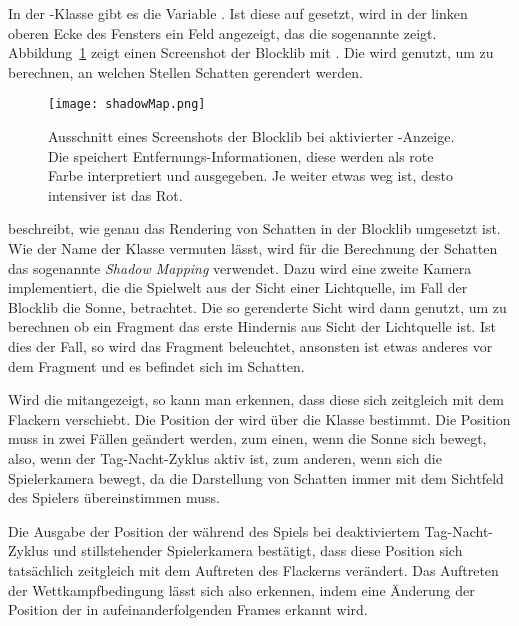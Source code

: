 In der -Klasse gibt es die Variable . Ist diese auf  gesetzt, wird in der linken oberen Ecke des Fensters ein Feld angezeigt, das die sogenannte  zeigt. Abbildung~\ref{fig:ShadowMap} zeigt einen Screenshot der Blocklib mit . Die  wird genutzt, um zu berechnen, an welchen Stellen Schatten gerendert werden.
\begin{figure}
	\centering
	\texttt{[image: shadowMap.png]}
	\caption[Ausschnitt eines Screenshots der Blocklib bei aktivierter -Anzeige.]{Ausschnitt eines Screenshots der Blocklib bei aktivierter -Anzeige. Die  speichert Entfernungs-Informationen, diese werden als rote Farbe interpretiert und ausgegeben. Je weiter etwas weg ist, desto intensiver ist das Rot.}\label{fig:ShadowMap}
\end{figure}
\textcite{Ebbinger2018} beschreibt, wie genau das Rendering von Schatten in der Blocklib umgesetzt ist. Wie der Name der Klasse  vermuten lässt, wird für die Berechnung der Schatten das sogenannte \emph{Shadow Mapping} verwendet. Dazu wird eine zweite Kamera implementiert, die die Spielwelt aus der Sicht einer Lichtquelle, im Fall der Blocklib die Sonne, betrachtet. Die so gerenderte Sicht wird dann genutzt, um zu berechnen ob ein Fragment das erste Hindernis aus Sicht der Lichtquelle ist. Ist dies der Fall, so wird das Fragment beleuchtet, ansonsten ist etwas anderes vor dem Fragment und es befindet sich im Schatten.

Wird die  mitangezeigt, so kann man erkennen, dass diese sich zeitgleich mit dem Flackern verschiebt. Die Position der  wird über die Klasse  bestimmt. Die Position muss in zwei Fällen geändert werden, zum einen, wenn die Sonne sich bewegt, also, wenn der Tag-Nacht-Zyklus aktiv ist, zum anderen, wenn sich die Spielerkamera bewegt, da die Darstellung von Schatten immer mit dem Sichtfeld des Spielers übereinstimmen muss.

Die Ausgabe der Position der  während des Spiels bei deaktiviertem Tag-Nacht-Zyklus und stillstehender Spielerkamera bestätigt, dass diese Position sich tatsächlich zeitgleich mit dem Auftreten des Flackerns verändert. Das Auftreten der Wettkampfbedingung lässt sich also erkennen, indem eine Änderung der Position der  in aufeinanderfolgenden Frames erkannt wird.

